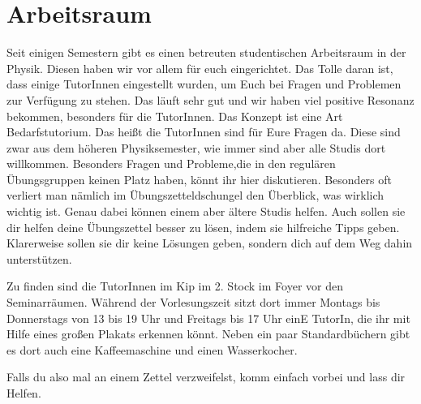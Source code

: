 \section{Arbeitsraum}
\label{sec:arbeitsraum}
Seit einigen Semestern gibt es einen betreuten studentischen Arbeitsraum in der Physik. Diesen haben wir vor allem für euch eingerichtet. Das Tolle daran ist, dass einige TutorInnen eingestellt wurden, um Euch bei Fragen und Problemen zur Verfügung zu stehen. Das läuft sehr gut und wir haben viel positive Resonanz bekommen, besonders für die TutorInnen. Das Konzept ist eine Art Bedarfstutorium. Das heißt die TutorInnen sind für Eure Fragen da. Diese sind zwar aus dem höheren Physiksemester, wie immer sind aber alle Studis dort willkommen. Besonders Fragen und Probleme,die in den regulären Übungsgruppen keinen Platz haben, könnt ihr hier diskutieren. Besonders oft verliert man nämlich im Übungszetteldschungel den Überblick, was wirklich wichtig ist. Genau dabei können einem aber ältere Studis helfen. Auch sollen sie dir helfen deine Übungszettel besser zu lösen, indem sie hilfreiche Tipps geben. Klarerweise sollen sie dir keine Lösungen geben, sondern dich auf dem Weg dahin unterstützen.

Zu finden sind die TutorInnen im Kip im 2. Stock im Foyer vor den Seminarräumen. Während der Vorlesungszeit sitzt dort immer Montags bis Donnerstags von 13 bis 19 Uhr und Freitags bis 17 Uhr einE TutorIn, die ihr mit Hilfe eines großen Plakats erkennen könnt. Neben ein paar Standardbüchern gibt es dort auch eine Kaffeemaschine und einen Wasserkocher.

Falls du also mal an einem Zettel verzweifelst, komm einfach vorbei und lass dir Helfen.
